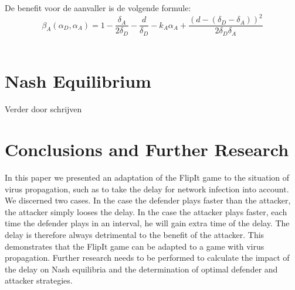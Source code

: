 \documentclass[master=cws, masteroption=vs,english]{kulemt}
\begin{document}
\begin{abstract*}
De benefit voor de aanvaller is de volgende formule:
\begin{equation}\label{first}
\beta_{A}(\alpha_{D},\alpha_{A}) = 1 -\dfrac{\delta_{A}}{2\delta_{D}} - \dfrac{d}{\delta_{D}} - k_{A} \alpha_{A} + \dfrac{(d - (\delta_{D} - \delta_{A}))^{2}}{2 \delta_{D} \delta_{A}}
\end{equation}\\


\section{Nash Equilibrium}
Verder door schrijven

\section{Conclusions and Further Research}
\label{ch:conclusion}
In this paper we presented an adaptation of the FlipIt game to the situation of virus propagation, such as to take the delay for network infection into account. We discerned two cases. In the case the defender plays faster than the attacker, the attacker simply looses the delay. In the case the attacker plays faster, each time the defender plays in an interval, he will gain extra time of the delay. The delay is therefore always detrimental to the benefit of the attacker. 
This demonstrates that the FlipIt game can be adapted to a game with virus propagation. Further research needs to be performed to calculate the impact of the delay on Nash equilibria and the determination of optimal defender and attacker strategies.
%  
\end{abstract*}
\end{document}
